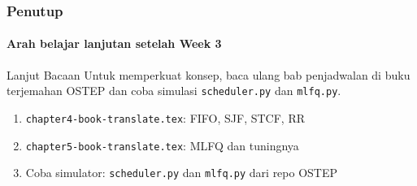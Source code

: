 \documentclass[t,aspectratio=169,xcolor=dvipsnames]{beamer}
\begin{document}
\begin{frame}
    \frametitle{Penutup}
    \framesubtitle{Arah belajar lanjutan setelah Week 3}
    \begin{exampleblock}{Lanjut Bacaan}
        Untuk memperkuat konsep, baca ulang bab penjadwalan di buku terjemahan OSTEP dan coba simulasi \texttt{scheduler.py} dan \texttt{mlfq.py}.
    \end{exampleblock}
    \vspace{0.1cm}
    \small
    \begin{enumerate}
        \item \texttt{chapter4-book-translate.tex}: FIFO, SJF, STCF, RR
        \item \texttt{chapter5-book-translate.tex}: MLFQ dan tuningnya
        \item Coba simulator: \texttt{scheduler.py} dan \texttt{mlfq.py} dari repo OSTEP
    \end{enumerate}
\end{frame}
\end{document}
